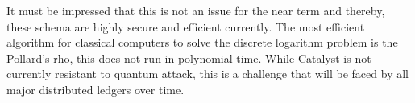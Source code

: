 It must be impressed that this is not an issue for the near term and thereby, these schema are highly secure and efficient currently. The most efficient algorithm for classical computers to solve the discrete logarithm problem is the Pollard's rho\cite{pollard}, this does not run in polynomial time. While Catalyst is not currently resistant to quantum attack, this is a challenge that will be faced by all major distributed ledgers over time. 